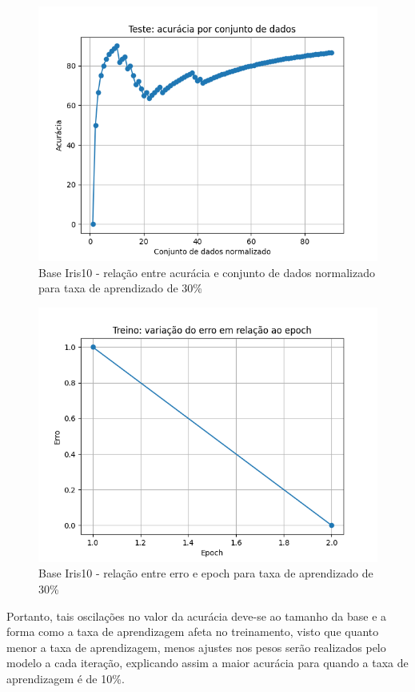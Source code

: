 \documentclass[12pt, %
openright, 
oneside, %
a4paper,    %
brazil]{facom-ufu-abntex2}
\begin{document}
\begin{figure}[H]
\centering
\includegraphics[scale=0.9]{figuras/acuracia_3.png}
\caption{Base Iris10 - relação entre acurácia e conjunto de dados normalizado para taxa de aprendizado de 30\%}
\label{fig:5}
\end{figure}

\begin{figure}[H]
\centering
\includegraphics[scale=0.9]{figuras/erro_3.png}
\caption{Base Iris10 - relação entre erro e epoch para taxa de aprendizado de 30\%}
\label{fig:6}
\end{figure}

Portanto, tais oscilações no valor da acurácia deve-se ao tamanho da base e a forma como a taxa de aprendizagem afeta no treinamento, visto que quanto menor a taxa de aprendizagem, menos ajustes nos pesos serão realizados pelo modelo a cada iteração, explicando assim a maior acurácia para quando a taxa de aprendizagem é de 10\%.
\end{document}
